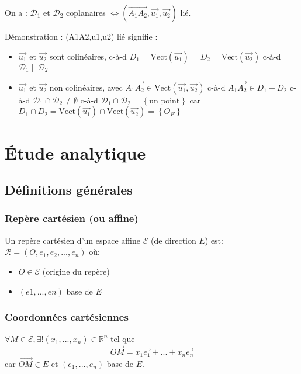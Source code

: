 \documentclass[12pt,a4paper,french]{book}
\begin{document}
\begin{itemize}
\begin{itemize}
\begin{itemize}
							On a : $\mathcal{D}_1$ et $\mathcal{D}_2$ coplanaires $\Leftrightarrow (\overrightarrow{A_1 A_2},\overrightarrow{u_1},\overrightarrow{u_2})$ lié.
							
							Démonstration : (A1A2,u1,u2) lié signifie : 
							\begin{itemize}
								\item $\overrightarrow{u_1}$ et $\overrightarrow{u_2}$ sont colinéaires, c-à-d $D_1 = \mbox{Vect}(\overrightarrow{u_1}) = D_2 = \mbox{Vect}(\overrightarrow{u_2})$ c-à-d $\mathcal{D}_1 \parallel \mathcal{D}_2$
								\item $\overrightarrow{u_1}$ et $\overrightarrow{u_2}$ non colinéaires, avec $\overrightarrow{A_1 A_2} \in \mbox{Vect}(\overrightarrow{u_1},\overrightarrow{u_2})$ c-à-d $\overrightarrow{A_1 A_2} \in D_1+D_2$ c-à-d $\mathcal{D}_1 \cap \mathcal{D}_2 \neq \emptyset$ c-à-d $\mathcal{D}_1 \cap \mathcal{D}_2 = \left\lbrace \mbox{un point}\right\rbrace$ car $D_1 \cap D_2 = \mbox{Vect}(\overrightarrow{u_1}) \cap \mbox{Vect}(\overrightarrow{u_2}) = \left\lbrace O_E\right\rbrace $
							\end{itemize}
						\end{itemize}
					\end{itemize}
				\end{itemize}
	\section{Étude analytique}
		\subsection{Définitions générales}
			\subsubsection{Repère cartésien (ou affine)}
				Un repère cartésien d'un espace affine $\mathcal{E}$ (de direction $E$) est: $\mathcal{R} = (O,e_1,e_2,...,e_n)$ où:
				\begin{itemize}
					\item $O \in \mathcal{E}$ (origine du repère)
					\item $(e1,...,en)$ base de $E$
				\end{itemize}
			\subsubsection{Coordonnées cartésiennes}
				$\forall M \in \mathcal{E}, \exists! (x_1,...,x_n) \in \mathbb{R}^{n}$ tel que \[\overrightarrow{OM} = x_1\overrightarrow{e_1} + ... + x_n\overrightarrow{e_n}\] car $\overrightarrow{OM} \in E$ et $(e_1,...,e_n)$ base de $E$.
				
\end{document}
